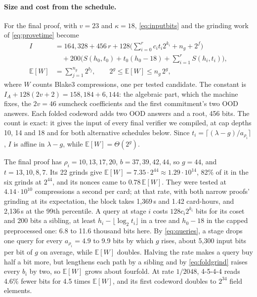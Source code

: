 \documentclass[11pt]{article}
\begin{document}
\paragraph{Size and cost from the schedule.} For the final proof, with
$v=23$ and $\kappa=18$, \eqref{eq:inputbits} and the grinding work of
\eqref{eq:provetime} become
\begin{equation}\label{eq:finalcost}
\begin{aligned}
I&=164{,}328+456\,r+128\Big(\sum_{i=0}^{r}c_it_i2^{k_i}+n_g+2^f\Big)\\
&\quad+200\Big(S(h_0,t_0)+t_0(h_0-18)+\sum_{i=1}^{r}S(h_i,t_i)\Big),\\
\mathbb{E}[W]&=\sum_{j=1}^{n_g}2^{b_j},\qquad 2^g\le\mathbb{E}[W]\le n_g\,2^g,
\end{aligned}
\end{equation}
where $W$ counts Blake3 compressions, one per tested candidate. The constant
is $I_A+128(2v+2)=158{,}184+6{,}144$: the algebraic part, which the machine
fixes, the $2v=46$ sumcheck coefficients and the first commitment's two OOD
answers. Each folded codeword adds two OOD answers and a root, 456 bits. The
count is exact: it gives the input of every final verifier we compiled, at
cap depths 10, 14 and 18 and for both alternative schedules below. Since
$t_i=\lceil(\lambda-g)/a_{\rho_i}\rceil$, $I$ is affine in $\lambda-g$, while
$\mathbb{E}[W]=\Theta(2^g)$.

The final proof has $\rho_i=10,13,17,20$, $b=37,39,42,44$, so $g=44$, and
$t=13,10,8,7$. Its 22 grinds give $\mathbb{E}[W]=7.35\cdot2^{44}\approx
1.29\cdot10^{14}$, 82\% of it in the six grinds at $2^{44}$, and its nonces
came to $0.78\,\mathbb{E}[W]$. They were tested at $4.14\cdot10^{10}$
compressions a second per card; at that rate, with both narrow proofs'
grinding at its expectation, the block takes 1{,}369\,s and 1.42
card-hours, and 2{,}136\,s at the 99th percentile. A query at stage $i$
costs $128c_i2^{k_i}$ bits for its coset and 200 bits a sibling, at least
$h_i-\lfloor\log_2t_i\rfloor$ in a tree and $h_0-18$ in the capped
preprocessed one: 6.8 to 11.6 thousand bits here. By \eqref{eq:queries}, a
stage drops one query for every $a_{\rho_i}=4.9$ to 9.9 bits by which $g$
rises, about 5{,}300 input bits per bit of $g$ on average, while
$\mathbb{E}[W]$ doubles. Halving the rate makes a query buy half a bit
more, but lengthens each path by a sibling and by \eqref{eq:foldgrind}
raises every $b_i$ by two, so $\mathbb{E}[W]$ grows about fourfold. At rate
$1/2048$, 4-5-4-4 reads 4.6\% fewer bits for 4.5 times $\mathbb{E}[W]$, and
its first codeword doubles to $2^{34}$ field elements.
\end{document}

